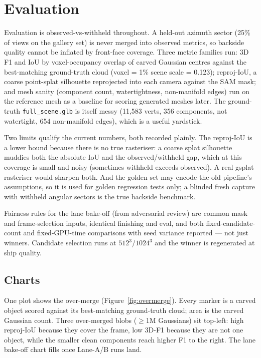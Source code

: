 \section{Evaluation}

Evaluation is observed-vs-withheld throughout. A held-out azimuth sector (25\% of views
on the gallery set) is never merged into observed metrics, so backside quality cannot be inflated by
front-face coverage. %
Three metric families run: 3D F1 and IoU by voxel-occupancy overlap of carved
Gaussian centres against the best-matching ground-truth cloud (voxel = 1\% scene scale = 0.123);
reproj-IoU, a coarse point-splat silhouette reprojected into each camera against the SAM mask; and
mesh sanity (component count, watertightness, non-manifold edges) run on the reference mesh as a
baseline for scoring generated meshes later. The ground-truth \texttt{full\_scene.glb} is itself
messy (11{,}583 verts, 356 components, not watertight, 654 non-manifold edges), which is a
useful yardstick.

Two limits qualify the current numbers, both recorded plainly. The reproj-IoU is a lower bound
because there is no true rasteriser: a coarse splat silhouette muddies both the absolute IoU and the
observed/withheld gap, which at this coverage is small and noisy (sometimes withheld exceeds
observed). A real gsplat rasteriser would sharpen both. And the golden set may encode the old
pipeline's assumptions, so it is used for golden regression tests only; a blinded fresh capture with
withheld angular sectors is the true backside benchmark.

Fairness rules for the lane bake-off (from adversarial review) are common mask and frame-selection
inputs, identical finishing and eval, and both fixed-candidate-count and fixed-GPU-time comparisons
with seed variance reported --- not just winners. Candidate selection runs at $512^3$/$1024^3$ and
the winner is regenerated at ship quality.

\subsection{Charts}
One plot shows the over-merge (Figure~\ref{fig:overmerge}). Every marker is a carved object
scored against its best-matching ground-truth cloud; area is the carved Gaussian count. Three
over-merged blobs ($\geq$1M Gaussians) sit top-left: high reproj-IoU because they cover the frame,
low 3D-F1 because they are not one object, while the smaller clean components reach higher F1 to
the right. The lane bake-off chart fills once Lane-A/B runs land.


